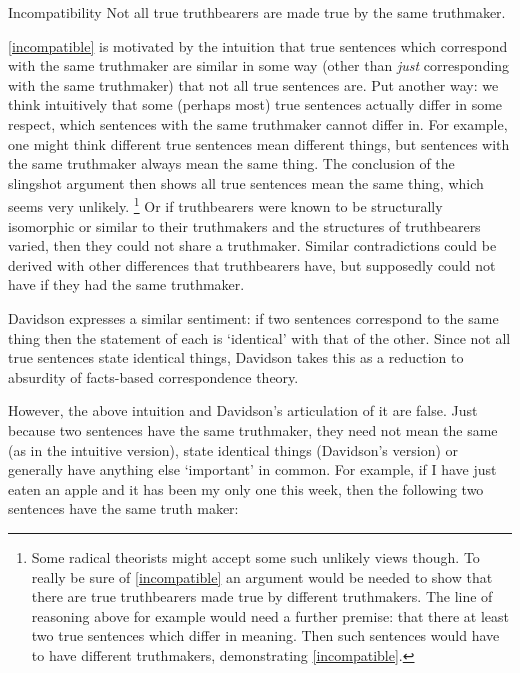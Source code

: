 	\begin{principle}{Incompatibility}\label{incompatible}
	Not all true truthbearers are made true by the same truthmaker.
	\end{principle}

\ref{incompatible} is motivated by the intuition that true sentences which correspond with the same truthmaker are similar in some way (other than \emph{just} corresponding with the same truthmaker) that not all true sentences are.
Put another way: we think intuitively that some (perhaps most) true sentences actually differ in some respect, which sentences with the same truthmaker cannot differ in.
For example, one might think different true sentences mean different things, but sentences with the same truthmaker always mean the same thing.
The conclusion of the slingshot argument then shows all true sentences mean the same thing, which seems very unlikely.
\footnote{Some radical theorists might accept some such unlikely views though.
To really be sure of \ref{incompatible} an argument would be needed to show that there are true truthbearers made true by different truthmakers.
The line of reasoning above for example would need a further premise: that there at least two true sentences which differ in meaning.
Then such sentences would have to have different truthmakers, demonstrating \ref{incompatible}.}
Or if truthbearers were known to be structurally isomorphic or similar to their truthmakers and the structures of truthbearers varied, then they could not share a truthmaker.
Similar contradictions could be derived with other differences that truthbearers have, but supposedly could not have if they had the same truthmaker.

Davidson expresses a similar sentiment: if two sentences correspond to the same thing then the statement of each is `identical' with that of the other.
Since not all true sentences state identical things, Davidson takes this as a reduction to absurdity of facts-based correspondence theory.
\parencite[750]{Davidson_1969}

However, the above intuition and Davidson's articulation of it are false.
Just because two sentences have the same truthmaker, they need not mean the same (as in the intuitive version), state identical things (Davidson's version) or generally have anything else `important' in common.
For example, if I have just eaten an apple and it has been my only one this week, then the following two sentences have the same truth maker:

